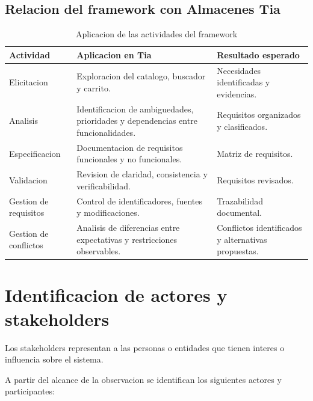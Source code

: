 \documentclass[11pt,a4paper]{article}
\begin{document}
\subsection{Relacion del framework con Almacenes Tia}

\begin{table}[H]
\centering
\caption{Aplicacion de las actividades del framework}
\small
\begin{tabularx}{\textwidth}{p{3cm}YY}
\toprule
\textbf{Actividad} &
\textbf{Aplicacion en Tia} &
\textbf{Resultado esperado} \\
\midrule

Elicitacion &
Exploracion del catalogo, buscador y carrito. &
Necesidades identificadas y evidencias. \\

Analisis &
Identificacion de ambiguedades, prioridades y
dependencias entre funcionalidades. &
Requisitos organizados y clasificados. \\

Especificacion &
Documentacion de requisitos funcionales y no
funcionales. &
Matriz de requisitos. \\

Validacion &
Revision de claridad, consistencia y verificabilidad. &
Requisitos revisados. \\

Gestion de requisitos &
Control de identificadores, fuentes y modificaciones. &
Trazabilidad documental. \\

Gestion de conflictos &
Analisis de diferencias entre expectativas y
restricciones observables. &
Conflictos identificados y alternativas propuestas. \\

\bottomrule
\end{tabularx}
\end{table}

\section{Identificacion de actores y stakeholders}

Los stakeholders representan a las personas o entidades
que tienen interes o influencia sobre el sistema.

A partir del alcance de la observacion se identifican
los siguientes actores y participantes:
\end{document}
